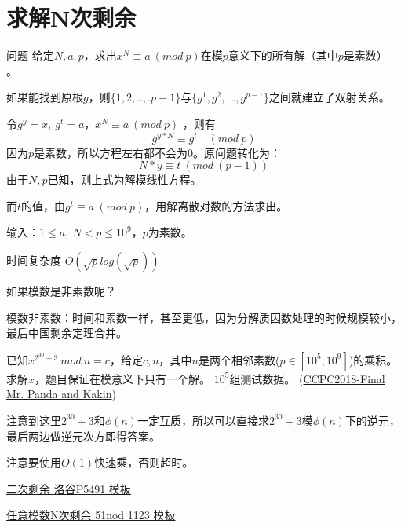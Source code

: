 \section{求解N次剩余}
\begin{custom}{问题}
	给定$N,a,p$，求出$x^N\equiv a\ (mod \ p)$在模$p$意义下的所有解（其中$p$是素数） 。
\end{custom}

\begin{solution}
	如果能找到原根$g$，则$\{1,2,..,.p-1\}$与$\{g^1,g^2,...,g^{p-1}\}$之间就建立了双射关系。
	
	令$g^y=x,\ g^t=a$，$x^N\equiv a\ (mod \ p)$ ，则有
	$$
	g^{y*N}\equiv g^t  \quad (mod \ p)
	$$
	因为$p$是素数，所以方程左右都不会为0。原问题转化为：
	$$
	N*y\equiv t\ (mod \ (p-1))
	$$
	由于$N,p$已知，则上式为解模线性方程。
	
	而$t$的值，由$g^t\equiv a \ (mod\ p)$，用解离散对数的方法求出。
\end{solution}

输入：$1 \le a,\ N < p \le 10^9$，$p$为素数。

{\heiti 时间复杂度}  $O(\sqrt{p}log(\sqrt{p}))$ 



{\heiti 如果模数是非素数呢？}

模数非素数：时间和素数一样，甚至更低，因为分解质因数处理的时候规模较小，最后中国剩余定理合并。


\begin{example}
	已知$x^{2^{30}+3}\ mod\ n = c$，给定$c,n$，其中$n$是两个相邻素数($p \in [10^5, 10^9]$)的乘积。求解$x$，题目保证在模意义下只有一个解。
	$10^5$组测试数据。
	(\href{https://codeforces.com/gym/102055/problem/K}{CCPC2018-Final Mr. Panda and Kakin})
\end{example}

\begin{solution}
	注意到这里$2^{30}+3$和$\phi(n)$一定互质，所以可以直接求$2^{30}+3$模$\phi(n)$下的逆元，最后两边做逆元次方即得答案。
	
	注意要使用$O(1)$快速乘，否则超时。
\end{solution}




\vbox{}

\vbox{}

\begin{problemset}
	\item \href{https://www.luogu.org/problem/P5491}{二次剩余 \quad 洛谷P5491 \quad 模板}
	\item \href{https://www.51nod.com/Challenge/Problem.html#problemId=1123}{任意模数N次剩余 \quad 51nod 1123 \quad 模板}
\end{problemset}